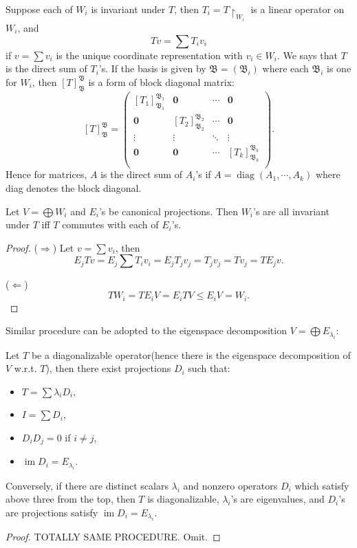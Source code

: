 Suppose each of $W_i$ is invariant under $T$, then $T_i = T\upharpoonright _{W_i}$ is a linear operator on $W_i$, and $$Tv = \sum T_i v_i$$ if $v = \sum v_i$ is the unique coordinate representation with $v_i \in W_i.$ We says that $T$ is the direct sum of $T_i$'s. If the basis is given by $\mathfrak B = (\mathfrak B_i)$ where each $\mathfrak B_i$ is one for $W_i$, then $[T]_{\mathfrak B}^{\mathfrak B} $ is a form of block diagonal matrix: $$[T]_{\mathfrak B}^{\mathfrak B} = \begin{pmatrix}
[T_1]_{\mathfrak B_1}^{\mathfrak B_1} & \mathbf 0 & \cdots & \mathbf 0 \\
\mathbf 0 & [T_2]_{\mathfrak B_2}^{\mathfrak B_2} & \cdots & \mathbf 0 \\
\vdots  & \vdots & \ddots & \vdots  \\
\mathbf 0  & \mathbf 0  & \cdots& [T_k]_{\mathfrak B_k}^{\mathfrak B_k} \\
\end{pmatrix}. $$ Hence for matrices, $A$ is the direct sum of $A_i$'s if $A = \operatorname{diag}(A_1,\cdots,A_k)$ where diag denotes the block diagonal.


\begin{theorem}Let $V=\bigoplus W_i$ and $E_i$'s be canonical projections. Then $W_i$'s are all invariant under $T$ iff $T$ commutes with each of $E_i$'s.
\end{theorem}
\begin{proof}($\Longrightarrow$) Let $v=\sum v_i$, then $$ E_j Tv = E_j \sum T_i v_i = E_j T_jv_j = T_j v_j =  T v_j = T E_j v.$$

($\Longleftarrow$) $$TW_i = TE_iV = E_i TV \le E_i V = W_i.$$
\end{proof}

Similar procedure can be adopted to the eigenspace decomposition $V = \bigoplus E_{\lambda_i}$:

\begin{theorem}Let $T$ be a diagonalizable operator(hence there is the eigenspace decomposition of $V$ w.r.t. $T$), then there exist projections $D_i$ such that:
\begin{itemize}
\item $T = \sum \lambda_i D_i$,
\item $I = \sum D_i$,
\item $D_i D_j = 0$ if $i\ne j$,
\item $\operatorname{im} D_i = E_{\lambda_i}.$
\end{itemize}
Conversely, if there are distinct scalars $\lambda_i$ and nonzero operators $D_i$ which satisfy above three from the top, then $T$ is diagonalizable, $\lambda_i$'s are eigenvalues, and $D_i$'s are projections satisfy $\operatorname{im} D_i = E_{\lambda_i}.$
\end{theorem}
\begin{proof}TOTALLY SAME PROCEDURE. Omit.\end{proof}

